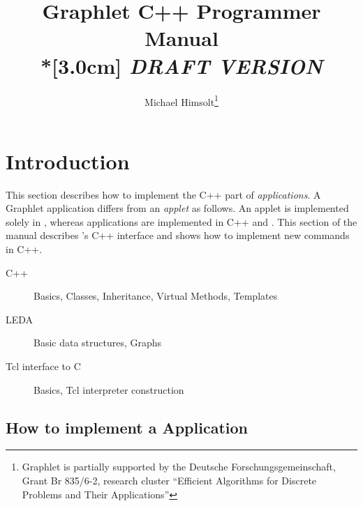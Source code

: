\documentclass[twoside,fleqn]{report}
\begin{document}
%
%




\title{Graphlet C++ Programmer Manual
  \\*[3.0cm]
  {\emph{DRAFT VERSION}}
  }

\author{Michael Himsolt\thanks{
    Graphlet is partially supported by the Deutsche
    Forschungsgemeinschaft, Grant Br 835/6-2,
    research cluster ``Efficient Algorithms for
    Discrete Problems and Their Applications''
    }
  }

\maketitle

\tableofcontents

%
%

\chapter{Introduction}
\label{c:Introduction}

This section describes how to implement the C++ part of
\Graphlet{} \emph{applications}.  A Graphlet application differs
from an \emph{applet} as follows. An applet is implemented solely
in \GraphScript{}, whereas applications are implemented in C++
and \GraphScript{}.  This section of the manual describes
\Graphlet{}'s C++ interface and shows how to implement new
\GraphScript{} commands in C++.

\begin{skills}
  \begin{description}

    \item[C++]
    Basics, Classes, Inheritance, Virtual Methods, Templates

    \item[LEDA]
    Basic data structures, Graphs

    \item[Tcl interface to C]
    Basics, Tcl interpreter construction

  \end{description}
\end{skills}


%
%

\section{How to implement a \Graphlet{} Application}
\end{document}
